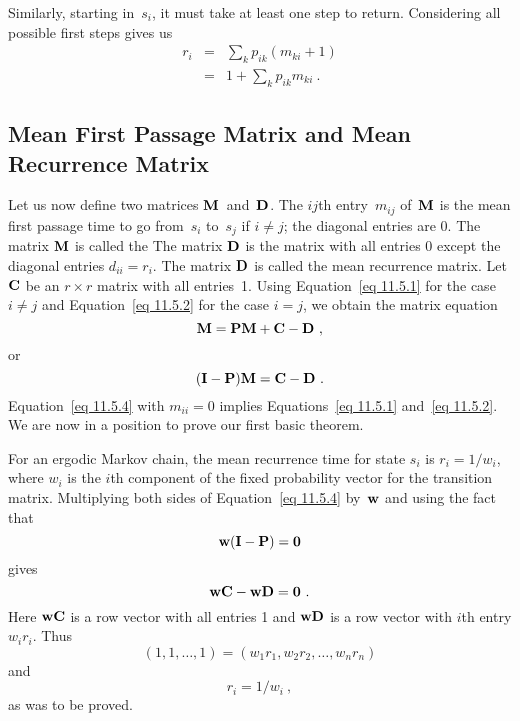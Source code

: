 Similarly, starting in~$s_i$, it must take at least one step to return. 
Considering all possible first steps gives us
\begin{eqnarray}
r_i &=& \sum_k p_{ik}(m_{ki} + 1) \\
    &=& 1 + \sum_k p_{ik} m_{ki}\ .\label{eq 11.5.2}
\end{eqnarray}

\subsection*{Mean First Passage Matrix and Mean Recurrence Matrix}
Let us now define two matrices ${\mbox{\bf M}\/}$~and~${\mbox{\bf D}\/}$.  The $ij$th
entry~$m_{ij}$
of~${\mbox{\bf M}\/}$ is the mean first passage time to go from~$s_i$ to~$s_j$ if $i \ne
j$;
the diagonal entries are 0.  The matrix ${\mbox{\bf M}\/}$ is called the 
  The matrix ${\mbox{\bf D}\/}$ is the matrix with all
entries 0 except
the diagonal entries $d_{ii} = r_i$.  The matrix ${\mbox{\bf D}\/}$ is called the \emx
{mean recurrence
matrix.}
Let ${\mbox{\bf C}\/}$ be an $r \times r$ matrix with all entries~1.  Using
Equation~\ref{eq 11.5.1} for
the case $i \ne j$ and Equation~\ref{eq 11.5.2} for the case $i = j$, we obtain
the matrix equation
\begin{equation}
{\mbox{\bf M}\/} = {\mbox{\bf P}\/} {\mbox{\bf M}\/} + {\mbox{\bf C}\/} - {\mbox{\bf D}\/}\ ,  
\label{eq 11.5.3}
\end{equation}
or
\begin{equation}
({\mbox{\bf I}\/} - {\mbox{\bf P}\/}) {\mbox{\bf M}\/} = {\mbox{\bf C}\/} - {\mbox{\bf D}\/}\ . 
\label{eq 11.5.4}
\end{equation}
Equation~\ref{eq 11.5.4} with $m_{ii} = 0$ implies Equations~\ref{eq 11.5.1}
and~\ref{eq 11.5.2}.  We are now in a position to prove our first basic
theorem.

\begin{theorem}
For an ergodic Markov chain, the mean recurrence time for state $s_i$ is $r_i =
1/w_i$, where $w_i$ is the $i$th component of the fixed probability vector for
the transition matrix.
\proof
Multiplying both sides of Equation~\ref{eq 11.5.4} by~${\mbox{\bf w}\/}$ and using the
fact
that 
$$
{\mbox{\bf w}\/}({\mbox{\bf I}\/} - {\mbox{\bf P}\/}) = {\mbox{\bf0}\/}
$$ 
gives
$$
{\mbox{\bf w}\/} {\mbox{\bf C}\/} - {\mbox{\bf w}\/} {\mbox{\bf D}\/} = {\mbox{\bf0}\/}\ .
$$
Here ${\mbox{\bf w}\/} {\mbox{\bf C}\/}$ is a row vector with all entries 1 and ${\mbox{\bf w}\/} {\mbox{\bf D}\/}$ 
is a row vector with $i$th entry $w_i r_i$.  Thus
$$
(1,1,\ldots,1) = (w_1r_1,w_2r_2,\ldots,w_nr_n)
$$
and
$$
r_i = 1/w_i\ ,
$$
as was to be proved.
\end{theorem}

